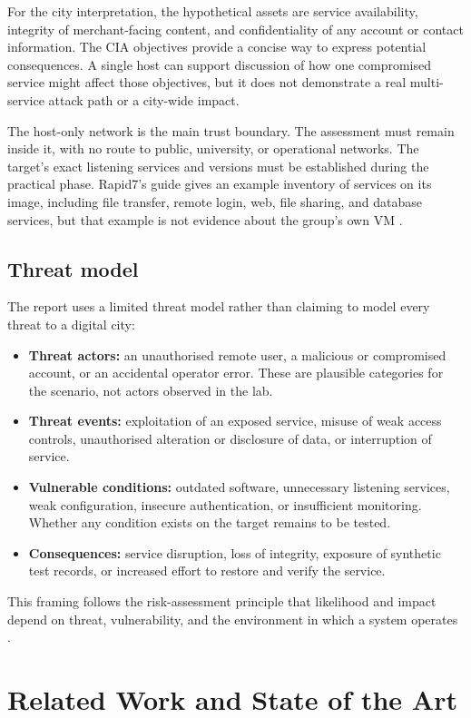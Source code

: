 \documentclass[11pt,a4paper]{article}
\begin{document}
For the city interpretation, the hypothetical assets are service availability, integrity of merchant-facing content, and confidentiality of any account or contact information. The CIA objectives provide a concise way to express potential consequences. A single host can support discussion of how one compromised service might affect those objectives, but it does not demonstrate a real multi-service attack path or a city-wide impact.

The host-only network is the main trust boundary. The assessment must remain inside it, with no route to public, university, or operational networks. The target's exact listening services and versions must be established during the practical phase. Rapid7's guide gives an example inventory of services on its image, including file transfer, remote login, web, file sharing, and database services, but that example is not evidence about the group's own VM \citep{rapid7_metasploitable}.

\subsection{Threat model}
The report uses a limited threat model rather than claiming to model every threat to a digital city:
\begin{itemize}
  \item \textbf{Threat actors:} an unauthorised remote user, a malicious or compromised account, or an accidental operator error. These are plausible categories for the scenario, not actors observed in the lab.
  \item \textbf{Threat events:} exploitation of an exposed service, misuse of weak access controls, unauthorised alteration or disclosure of data, or interruption of service.
  \item \textbf{Vulnerable conditions:} outdated software, unnecessary listening services, weak configuration, insecure authentication, or insufficient monitoring. Whether any condition exists on the target remains to be tested.
  \item \textbf{Consequences:} service disruption, loss of integrity, exposure of synthetic test records, or increased effort to restore and verify the service.
\end{itemize}
This framing follows the risk-assessment principle that likelihood and impact depend on threat, vulnerability, and the environment in which a system operates \citep{jointtaskforce2012}.

\section{Related Work and State of the Art}
\end{document}
